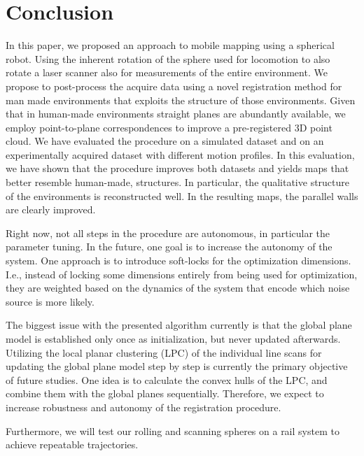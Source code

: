 \section{Conclusion}

In this paper, we proposed an approach to mobile mapping using a spherical robot. 
Using the inherent rotation of the sphere used for locomotion to also rotate a laser scanner also for measurements of the entire environment.
We propose to post-process the acquire data using a novel registration method for man made environments that exploits the structure of those environments. 
Given that in human-made environments straight planes are abundantly available, we employ point-to-plane correspondences to improve a pre-registered 3D point cloud. 
We have evaluated the procedure on a simulated dataset and on an experimentally acquired dataset with different motion profiles. 
In this evaluation, we have shown that the procedure improves both datasets and yields maps that better resemble human-made, structures. 
In particular, the qualitative structure of the environments is reconstructed well. 
In the resulting maps, the parallel walls are clearly improved.

%
Right now, not all steps in the procedure are autonomous, in particular the parameter tuning. 
In the future, one goal is to increase the autonomy of the system.
One approach is to introduce soft-locks for the optimization dimensions.
I.e., instead of locking some dimensions entirely from being used for optimization, they are weighted based on the dynamics of the system that encode which noise source is more likely.  

%
The biggest issue with the presented algorithm currently is that the global plane model is established only once as initialization, but never updated afterwards.
Utilizing the local planar clustering (LPC) of the individual line scans for updating the global plane model step by step is currently the primary objective of future studies.
One idea is to calculate the convex hulls of the LPC, and combine them with the global planes sequentially.
Therefore, we expect to increase robustness and autonomy of the registration procedure.

%
Furthermore, we will test our rolling and scanning spheres on a rail system to achieve repeatable trajectories. 
